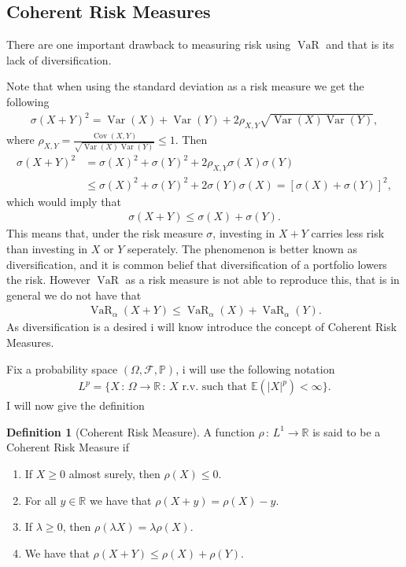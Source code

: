 \documentclass{article}
\theoremstyle{definition}
\newtheorem{definition}[theorem]{Definition}
\numberwithin{equation}{section}
\DeclareMathOperator*{\var}{Var}
\DeclareMathOperator*{\cov}{Cov}
\DeclareMathOperator{\VaR}{VaR}
\begin{document}
\subsection{Coherent Risk Measures}

There are one important drawback to measuring risk using $\VaR$ and that is its lack of diversification.

Note that when using the standard deviation as a risk measure we get the following
\begin{align}
    \sigma(X + Y)^2 = \var(X) + \var(Y) + 2\rho_{X,Y}\sqrt{\var(X)\var(Y)},
\end{align}
where $\rho_{X,Y} = \frac{\cov(X,Y)}{\sqrt{\var(X)\var(Y)}} \leq 1$.
Then
\begin{align}
    \sigma(X + Y)^2 &= \sigma(X)^2 + \sigma(Y)^2 + 2\rho_{X,Y}\sigma(X)\sigma(Y)\\
    &\leq \sigma(X)^2 + \sigma(Y)^2 + 2\sigma(Y)\sigma(X) = \left[\sigma(X) + \sigma(Y)\right]^2, 
\end{align}
which would imply that
\begin{align}
    \sigma(X + Y) \leq \sigma(X) + \sigma(Y).
\end{align}
This means that, under the risk measure $\sigma$, investing in $X + Y$ carries less risk than investing in $X$ or $Y$ seperately.
The phenomenon is better known as diversification, and it is common belief that diversification of a portfolio lowers the risk.
However $\VaR$ as a risk measure is not able to reproduce this, that is in general we do not have that
\begin{align}
    \VaR_\alpha(X + Y) \leq \VaR_\alpha(X) + \VaR_\alpha(Y).
\end{align}
As diversification is a desired i will know introduce the concept of Coherent Risk Measures.

Fix a probability space $(\Omega, \mathscr{F}, \mathbb{P})$, i will use the following notation
\begin{align}
    L^p = \{X \, : \, \Omega \rightarrow \mathbb{R} \, : \, X \text{ r.v. such that } \mathbb{E}(|X|^p) < \infty\}.
\end{align}
I will now give the definition
\begin{definition}[Coherent Risk Measure]
    A function $\rho \, : \, L^1 \rightarrow \mathbb{R}$ is said to be a Coherent Risk Measure if
    \begin{enumerate}
        \item If $X \geq 0$ almost surely, then $\rho(X) \leq 0$.
        \item For all $y \in \mathbb{R}$ we have that $\rho(X + y) = \rho(X) - y$.
        \item If $\lambda \geq 0$, then $\rho(\lambda X) = \lambda \rho(X)$.
        \item We have that $\rho(X + Y) \leq \rho(X) + \rho(Y)$.
    \end{enumerate}
\end{definition}
\end{document}
